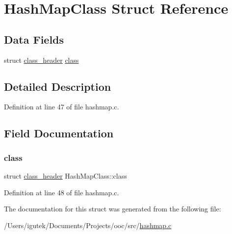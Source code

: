 \hypertarget{structHashMapClass}{}\section{Hash\+Map\+Class Struct Reference}
\label{structHashMapClass}
\subsection*{Data Fields}
\begin{DoxyCompactItemize}
\item 
struct \mbox{\hyperlink{structclass__header}{class\+\_\+header}} \mbox{\hyperlink{structHashMapClass_a40efeba47bf8edd1af861faef03a58c4}{class}}
\end{DoxyCompactItemize}


\subsection{Detailed Description}


Definition at line 47 of file hashmap.\+c.



\subsection{Field Documentation}
\mbox{\label{structHashMapClass_a40efeba47bf8edd1af861faef03a58c4}} 
\subsubsection{\texorpdfstring{class}{class}}
{\footnotesize\ttfamily struct \mbox{\hyperlink{structclass__header}{class\+\_\+header}} Hash\+Map\+Class\+::class}



Definition at line 48 of file hashmap.\+c.



The documentation for this struct was generated from the following file\+:\begin{DoxyCompactItemize}
\item 
/\+Users/igutek/\+Documents/\+Projects/ooc/src/\mbox{\hyperlink{hashmap_8c}{hashmap.\+c}}\end{DoxyCompactItemize}
